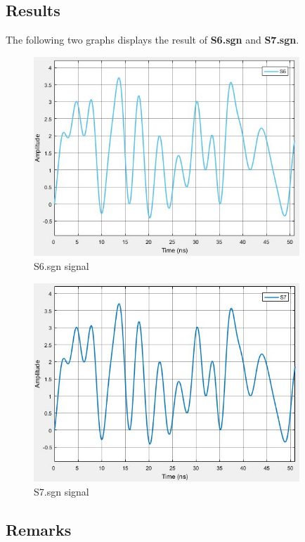 \subsection*{Results}
The following two graphs displays the result of \textbf{S6.sgn} and \textbf{S7.sgn}.
\begin{figure}[h]
	\centering
	\includegraphics[width=10cm]{./algorithms/filter/figures/S6.jpg}
	\caption{S6.sgn signal}
	\label{S6}
\end{figure}
\begin{figure}[h]
	\centering
	\includegraphics[width=10cm]{./algorithms/filter/figures/S7.jpg}
	\caption{S7.sgn signal}
	\label{S7}
\end{figure}

\subsection*{Remarks}

\newpage

